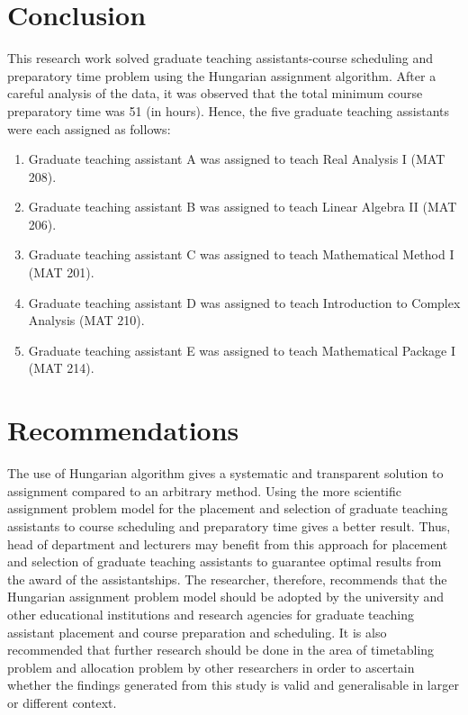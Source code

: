 \documentclass[11pt]{report}
\begin{document}
	
	\section{Conclusion}
	This research work solved graduate teaching assistants-course scheduling and preparatory time problem using the Hungarian assignment algorithm. After a careful analysis of the data, it was observed that the total minimum course preparatory time was 51 (in hours). Hence, the five graduate teaching assistants were each assigned as follows:
	\begin{enumerate}
		\item Graduate teaching assistant A was assigned to teach Real Analysis I (MAT 208).
		\item Graduate teaching assistant B was assigned to teach Linear Algebra II (MAT 206).
		\item Graduate teaching assistant C was assigned to teach Mathematical Method I (MAT 201).
		\item Graduate teaching assistant D was assigned to teach Introduction to Complex Analysis
		(MAT 210).
		\item Graduate teaching assistant E was assigned to teach Mathematical Package I (MAT 214).
	\end{enumerate}
	
	\section{Recommendations}
	The use of Hungarian algorithm gives a systematic and transparent solution to assignment compared to an arbitrary method. Using the more scientific assignment problem model for the placement and selection of graduate teaching assistants to course scheduling and preparatory time gives a better result. Thus, head of department and lecturers may benefit from this approach for placement and selection of graduate teaching assistants to guarantee optimal results from the award of the assistantships. The researcher, therefore, recommends that the Hungarian assignment problem model should be adopted by the university and other educational institutions and research
	agencies for graduate teaching assistant placement and course preparation and scheduling. It is also recommended that further research should be done in the area of timetabling problem and allocation problem by other researchers in order to ascertain whether the findings generated from this study is valid and generalisable in larger or different context.
	
\end{document}
